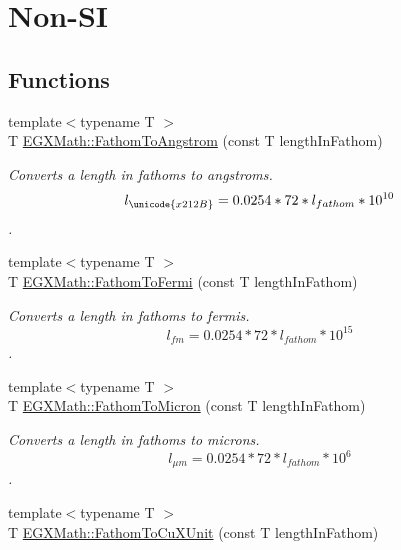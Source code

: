 \hypertarget{group___e_g_x_math-_conversions-_length_conversions-_nautical-_fathom-_non-_s_i}{}\section{Non-\/\+SI}
\label{group___e_g_x_math-_conversions-_length_conversions-_nautical-_fathom-_non-_s_i}
\subsection*{Functions}
\begin{DoxyCompactItemize}
\item 
{\footnotesize template$<$typename T $>$ }\\T \mbox{\hyperlink{group___e_g_x_math-_conversions-_length_conversions-_nautical-_fathom-_non-_s_i_gac03859840078c2a19cbf1f79bcf2b919}{E\+G\+X\+Math\+::\+Fathom\+To\+Angstrom}} (const T length\+In\+Fathom)
\begin{DoxyCompactList}\small\item\em Converts a length in fathoms to angstroms. \[ l_{\unicode{x212B}}=0.0254 * 72 * l_{fathom} * 10^{10} \]. \end{DoxyCompactList}\item 
{\footnotesize template$<$typename T $>$ }\\T \mbox{\hyperlink{group___e_g_x_math-_conversions-_length_conversions-_nautical-_fathom-_non-_s_i_ga4590b655273e874c79a47de291226548}{E\+G\+X\+Math\+::\+Fathom\+To\+Fermi}} (const T length\+In\+Fathom)
\begin{DoxyCompactList}\small\item\em Converts a length in fathoms to fermis. \[ l_{fm}=0.0254 * 72 * l_{fathom} * 10^{15} \]. \end{DoxyCompactList}\item 
{\footnotesize template$<$typename T $>$ }\\T \mbox{\hyperlink{group___e_g_x_math-_conversions-_length_conversions-_nautical-_fathom-_non-_s_i_ga491b6bb1b4db49ba22471e9ca9855198}{E\+G\+X\+Math\+::\+Fathom\+To\+Micron}} (const T length\+In\+Fathom)
\begin{DoxyCompactList}\small\item\em Converts a length in fathoms to microns. \[ l_{\mu m}=0.0254 * 72 * l_{fathom} * 10^{6} \]. \end{DoxyCompactList}\item 
{\footnotesize template$<$typename T $>$ }\\T \mbox{\hyperlink{group___e_g_x_math-_conversions-_length_conversions-_nautical-_fathom-_non-_s_i_ga6692d3fad4af03d78145e34bf0a6c2ac}{E\+G\+X\+Math\+::\+Fathom\+To\+Cu\+X\+Unit}} (const T length\+In\+Fathom)

\end{DoxyCompactItemize}
